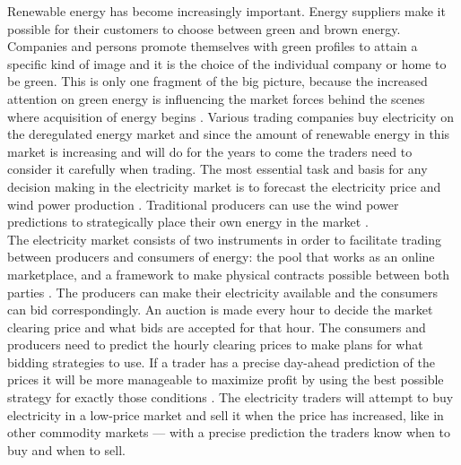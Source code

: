 Renewable energy has become increasingly important. Energy suppliers make it possible for their customers to choose between green and brown energy. Companies and persons promote themselves with green profiles to attain a specific kind of image and it is the choice of the individual company or home to be green. This is only one fragment of the big picture, because the increased attention on green energy is influencing the market forces behind the scenes where acquisition of energy begins \cite{windPowerDanishLiberalized}. Various trading companies buy electricity on the deregulated energy market and since the amount of renewable energy in this market is increasing and will do for the years to come\cite{6, windPowerDanishLiberalized} the traders need to consider it carefully when trading. The most essential task and basis for any decision making in the electricity market is to forecast the electricity price \cite{pjmForecast} and wind power production \cite{dayAheadImpactOfWindPowerForecasts}. Traditional producers can use the wind power predictions to strategically place their own energy in the market \cite{21}.
\\[0.5cm]
The electricity market consists of two instruments in order to facilitate trading between producers and consumers of energy: the pool that works as an online marketplace, and a framework to make physical contracts possible between both parties \cite{21}. The producers can make their electricity available and the consumers can bid correspondingly. An auction is made every hour to decide the market clearing price and what bids are accepted for that hour. The consumers and producers need to predict the hourly clearing prices to make plans for what bidding strategies to use. If a trader has a precise day-ahead prediction of the prices it will be more manageable to maximize profit by using the best possible strategy for exactly those conditions \cite{21}. The electricity traders will attempt to buy electricity in a low-price market and sell it when the price has increased, like in other commodity markets --- with a precise prediction the traders know when to buy and when to sell. 

